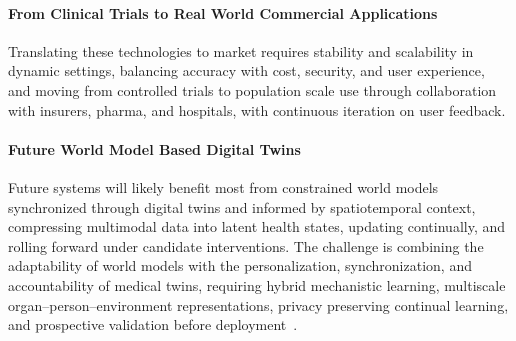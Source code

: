 \documentclass[journal]{IEEEtran}
\begin{document}
\paragraph{From Clinical Trials to Real World Commercial Applications}
Translating these technologies to market requires stability and scalability in dynamic settings, balancing accuracy with cost, security, and user experience, and moving from controlled trials to population scale use through collaboration with insurers, pharma, and hospitals, with continuous iteration on user feedback.

\paragraph{Future World Model Based Digital Twins}
Future systems will likely benefit most from constrained world models synchronized through digital twins and informed by spatiotemporal context, compressing multimodal data into latent health states, updating continually, and rolling forward under candidate interventions. The challenge is combining the adaptability of world models with the personalization, synchronization, and accountability of medical twins, requiring hybrid mechanistic learning, multiscale organ--person--environment representations, privacy preserving continual learning, and prospective validation before deployment~\cite{DeDomenico2025ComplexSystems}.


\end{document}
